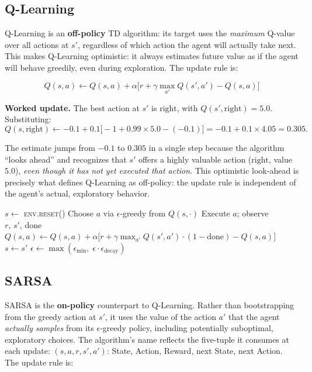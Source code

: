 \documentclass[11pt]{article}
\begin{document}
\subsection{Q-Learning}
\label{sec:qlearning}

Q-Learning \cite{watkins1989} is an \textbf{off-policy} TD algorithm: its
target uses the \emph{maximum} Q-value over all actions at $s'$, regardless
of which action the agent will actually take next. This makes Q-Learning
optimistic: it always estimates future value as if the agent will behave
greedily, even during exploration. The update rule is:

\[
    Q(s, a) \leftarrow Q(s, a) + \alpha \Big[
        r + \gamma \max_{a'} Q(s', a') - Q(s, a)
    \Big]
\]

\textbf{Worked update.} The best action at $s'$ is $\text{right}$, with
$Q(s', \text{right}) = 5.0$. Substituting:
\[
    Q(s, \text{right}) \leftarrow
    -0.1 + 0.1 \big[-1 + 0.99 \times 5.0 - (-0.1)\big]
    = -0.1 + 0.1 \times 4.05 = 0.305.
\]

The estimate jumps from $-0.1$ to $0.305$ in a single step because the
algorithm ``looks ahead'' and recognizes that $s'$ offers a highly
valuable action ($\text{right}$, value $5.0$), \emph{even though it has
not yet executed that action}. This optimistic look-ahead is precisely
what defines Q-Learning as off-policy: the update rule is independent of
the agent's actual, exploratory behavior.

\begin{algorithm}[H]
\caption{Q-Learning (one episode)}
\begin{algorithmic}[1]
\State $s \leftarrow$ \textsc{env.reset()}
    \State Choose $a$ via $\epsilon$-greedy from $Q(s, \cdot)$
    \State Execute $a$; observe $r,\, s',\, \text{done}$
    \State $Q(s,a) \leftarrow Q(s,a) +
           \alpha\bigl[r + \gamma \max_{a'} Q(s',a') \cdot (1-\text{done})
           - Q(s,a)\bigr]$
    \State $s \leftarrow s'$
\EndWhile
\State $\epsilon \leftarrow \max(\epsilon_{\min},\; \epsilon \cdot \epsilon_{\text{decay}})$
\end{algorithmic}
\end{algorithm}

\subsection{SARSA}
\label{sec:sarsa}

SARSA \cite{rummery1994} is the \textbf{on-policy} counterpart to
Q-Learning. Rather than bootstrapping from the greedy action at $s'$, it
uses the value of the action $a'$ that the agent \emph{actually samples}
from its $\epsilon$-greedy policy, including potentially suboptimal,
exploratory choices. The algorithm's name reflects the five-tuple it
consumes at each update: $(s, a, r, s', a')$: State, Action, Reward,
next State, next Action. The update rule is:
\end{document}
